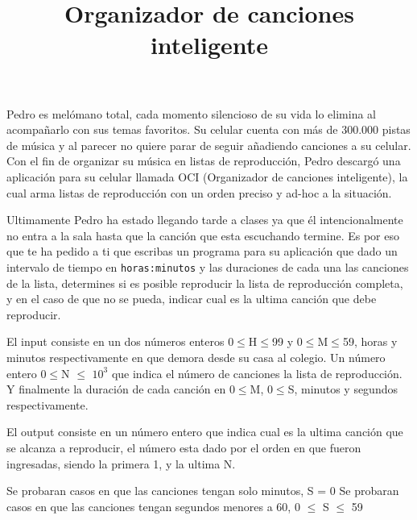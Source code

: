\documentclass{oci}
\title{Organizador de canciones inteligente}
\begin{document}
\begin{problemDescription}
Pedro es melómano total, cada momento silencioso de su vida lo elimina
al acompañarlo con sus temas favoritos. Su celular cuenta con más de
300.000 pistas de música y al parecer no quiere parar de seguir
añadiendo canciones a su celular. Con el fin de organizar su música en
listas de reproducción, Pedro descargó una aplicación para su celular
llamada OCI (Organizador de canciones inteligente), la cual arma listas
de reproducción con un orden preciso y ad-hoc a la situación.

Ultimamente Pedro ha estado llegando tarde a clases ya que él
intencionalmente no entra a la sala hasta que la canción que esta
escuchando termine. Es por eso que te ha pedido a ti que escribas un
programa para su aplicación que dado un intervalo de tiempo en
\texttt{horas:minutos} y las duraciones de cada una las canciones de la
lista, determines si es posible reproducir la lista de reproducción
completa, y en el caso de que no se pueda, indicar cual es la ultima
canción que debe reproducir.
\end{problemDescription}

\begin{inputDescription}
El input consiste en un dos números enteros 0\(\leq\)H\(\leq\)99 y
0\(\leq\)M\(\leq\)59, horas y minutos respectivamente en que demora
desde su casa al colegio. Un número entero 0\(\leq\)N \(\leq\) \(10^3\)
que indica el número de canciones la lista de reproducción. Y finalmente
la duración de cada canción en 0\(\leq\)M,
0\(\leq\)S, minutos y segundos respectivamente.
\end{inputDescription}

\begin{outputDescription}
El output consiste en un número entero que indica cual
es la ultima canción que se alcanza a reproducir, el número esta dado por el
orden en que fueron ingresadas, siendo la primera 1, y la ultima N.
\end{outputDescription}

\begin{scoreDescription}
   Se probaran casos en que las canciones tengan solo minutos, S = 0
   Se probaran casos en que las canciones tengan segundos menores a 60, 0 $\leq$ S $\leq$ 59
\end{scoreDescription}

\begin{sampleDescription}
\end{sampleDescription}
\end{document}

